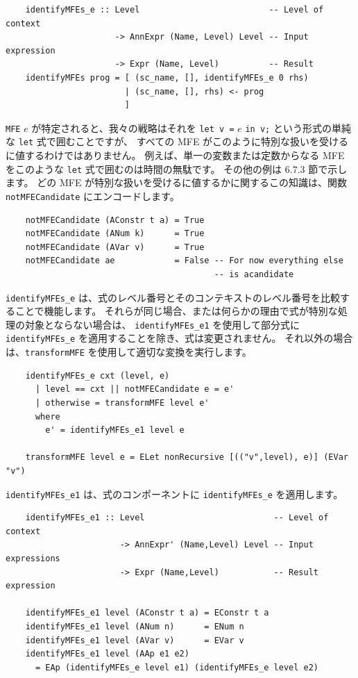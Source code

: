 \documentclass{jbook}
\begin{document}
\begin{verbatim}
	identifyMFEs_e :: Level                          -- Level of context
	                  -> AnnExpr (Name, Level) Level -- Input expression
	                  -> Expr (Name, Level)          -- Result
	identifyMFEs prog = [ (sc_name, [], identifyMFEs_e 0 rhs)
	                    | (sc_name, [], rhs) <- prog
	                    ]
\end{verbatim}

\texttt{MFE} $e$ が特定されると、我々の戦略はそれを \texttt{let v =} $e$ \texttt{in v;} という形式の単純な \texttt{let} 式で囲むことですが、
すべての MFE がこのように特別な扱いを受けるに値するわけではありません。
例えば、単一の変数または定数からなる MFE をこのような \texttt{let} 式で囲むのは時間の無駄です。
その他の例は 6.7.3 節で示します。
どの MFE が特別な扱いを受けるに値するかに関するこの知識は、関数 \texttt{notMFECandidate} にエンコードします。

\begin{verbatim}
	notMFECandidate (AConstr t a) = True
	notMFECandidate (ANum k)      = True
	notMFECandidate (AVar v)      = True
	notMFECandidate ae            = False -- For now everything else
	                                      -- is acandidate
\end{verbatim}

\texttt{identifyMFEs\_e} は、式のレベル番号とそのコンテキストのレベル番号を比較することで機能します。
それらが同じ場合、または何らかの理由で式が特別な処理の対象とならない場合は、
\texttt{identifyMFEs\_e1} を使用して部分式に \texttt{identifyMFEs\_e} を適用することを除き、式は変更されません。
それ以外の場合は、\texttt{transformMFE} を使用して適切な変換を実行します。

\begin{verbatim}
	identifyMFEs_e cxt (level, e)
	  | level == cxt || notMFECandidate e = e'
	  | otherwise = transformMFE level e'
	  where
	    e' = identifyMFEs_e1 level e

	transformMFE level e = ELet nonRecursive [(("v",level), e)] (EVar "v")
\end{verbatim}

\texttt{identifyMFEs\_e1} は、式のコンポーネントに \texttt{identifyMFEs\_e} を適用します。

\begin{verbatim}
	identifyMFEs_e1 :: Level                          -- Level of context
	                   -> AnnExpr' (Name,Level) Level -- Input expressions
	                   -> Expr (Name,Level)           -- Result expression

	identifyMFEs_e1 level (AConstr t a) = EConstr t a
	identifyMFEs_e1 level (ANum n)      = ENum n
	identifyMFEs_e1 level (AVar v)      = EVar v
	identifyMFEs_e1 level (AAp e1 e2)
	  = EAp (identifyMFEs_e level e1) (identifyMFEs_e level e2)
\end{verbatim}
\end{document}
